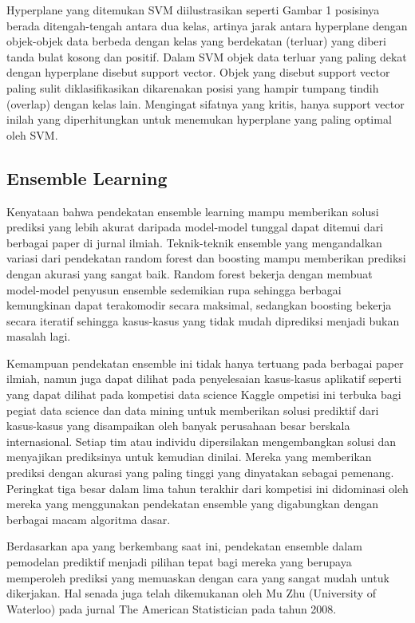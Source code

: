 \documentclass[conference]{IEEEtran}
\begin{document}
Hyperplane yang ditemukan SVM diilustrasikan seperti Gambar 1 posisinya berada ditengah-tengah antara dua kelas, artinya jarak antara hyperplane dengan objek-objek data berbeda dengan kelas yang berdekatan (terluar) yang diberi tanda bulat kosong dan positif. Dalam SVM objek data terluar yang paling dekat dengan hyperplane disebut support vector. Objek yang disebut support vector paling sulit diklasifikasikan dikarenakan posisi yang hampir tumpang tindih (overlap) dengan kelas lain. Mengingat sifatnya yang kritis, hanya support vector inilah yang diperhitungkan untuk menemukan hyperplane yang paling optimal oleh SVM.

\subsection{Ensemble Learning}
Kenyataan bahwa pendekatan ensemble learning mampu memberikan solusi prediksi yang lebih akurat daripada model-model tunggal dapat ditemui dari berbagai paper di jurnal ilmiah.  Teknik-teknik ensemble yang mengandalkan variasi dari pendekatan random forest dan boosting mampu memberikan prediksi dengan akurasi yang sangat baik.  Random forest bekerja dengan membuat model-model penyusun ensemble sedemikian rupa sehingga berbagai kemungkinan dapat terakomodir secara maksimal, sedangkan boosting bekerja secara iteratif sehingga kasus-kasus yang tidak mudah diprediksi menjadi bukan masalah lagi.

Kemampuan pendekatan ensemble ini tidak hanya tertuang pada berbagai paper ilmiah, namun juga dapat dilihat pada penyelesaian kasus-kasus aplikatif seperti yang dapat dilihat pada kompetisi data science Kaggle ompetisi ini terbuka bagi pegiat data science dan data mining untuk memberikan solusi prediktif dari kasus-kasus yang disampaikan oleh banyak perusahaan besar berskala internasional.  Setiap tim atau individu dipersilakan mengembangkan solusi dan menyajikan prediksinya untuk kemudian dinilai.  Mereka yang memberikan prediksi dengan akurasi yang paling tinggi yang dinyatakan sebagai pemenang.  Peringkat tiga besar dalam lima tahun terakhir dari kompetisi ini didominasi oleh mereka yang menggunakan pendekatan ensemble yang digabungkan dengan berbagai macam algoritma dasar.

Berdasarkan apa yang berkembang saat ini, pendekatan ensemble dalam pemodelan prediktif menjadi pilihan tepat bagi mereka yang berupaya memperoleh prediksi yang memuaskan dengan cara yang sangat mudah untuk dikerjakan.  Hal senada juga telah dikemukanan oleh Mu Zhu (University of Waterloo) pada jurnal The American Statistician pada tahun 2008.
\end{document}

